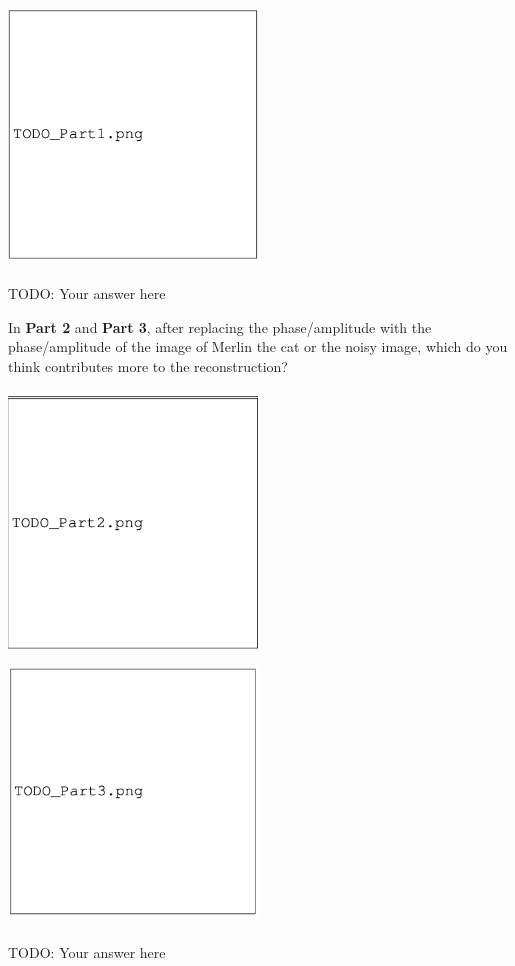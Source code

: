 \documentclass{csci1430}
\begin{document}
\begin{answer}
\includegraphics[width=0.5\textwidth,height=7cm,keepaspectratio]{images/TODO_Part1.png}

TODO: Your answer here
\end{answer}

\newpage

\begin{subquestion}[points=2]
In \textbf{Part 2} and \textbf{Part 3}, after replacing the phase/amplitude with the phase/amplitude of the image of Merlin the cat or the noisy image, which do you think contributes more to the reconstruction?
\end{subquestion}

\begin{answer}
\includegraphics[width=0.5\textwidth,height=7cm,keepaspectratio]{images/TODO_Part2.png}
\includegraphics[width=0.5\textwidth,height=7cm,keepaspectratio]{images/TODO_Part3.png}
        
TODO: Your answer here
\end{answer}
\end{document}
